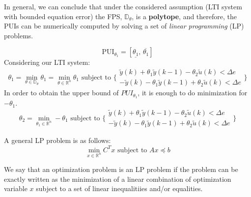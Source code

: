 In general, we can conclude that under the considered assumption (LTI system with bounded equation error) the FPS, \(\mathbb{D}_\theta\), is a \textbf{polytope}, and therefore, the PUIs can be numerically computed by solving a set of \textit{linear programming} (LP) problems. \\
\begin{example}[example]
\[
\text{PUI}_{\theta_1} = \left[\underline{\theta_1}, \, \overline{\theta_1}\right]
\]
Considering our LTI system:
\[
\theta_1 = \min\limits_{\theta \in \mathbb{D}_\theta} \theta_1 = \min\limits_{\theta \in \mathbb{R}^n} \theta_1 \text{ subject to }\{ 
\begin{array}{l}
\tilde{y}(k) + \theta_1 \tilde{y}(k-1) - \theta_2 \tilde{u}(k) < \Delta e \\[1ex]
-\tilde{y}(k) - \theta_1 \tilde{y}(k-1) + \theta_2 \tilde{u}(k) < \Delta e
\end{array}\}
\]
In order to obtain the upper bound of \( PUI_{\theta_1} \), it is enough to do minimization for \(-\theta_1\).
\[
\theta_2 = \min\limits_{\theta_1 \in \mathbb{R}^n} -\theta_1 \text{ subject to } \{ 
\begin{array}{l}
\tilde{y}(k) + \theta_1 \tilde{y}(k-1) - \theta_2 \tilde{u}(k) < \Delta e \\[1ex]
-\tilde{y}(k) - \theta_1 \tilde{y}(k-1) + \theta_2 \tilde{u}(k) < \Delta e
\end{array}
\}
\]

\end{example}
A general LP problem is as follows:\\

\[
\min \limits_{x \in \mathbb{R}^n} C^Tx \text{ subject to } Ax\preceq b 
\]

We say that an optimization problem is an LP problem if the problem can be exactly written as the minimization of a linear combination of optimization variable \(x\) subject to a set of linear inequalitiies and/or equalities.\\

